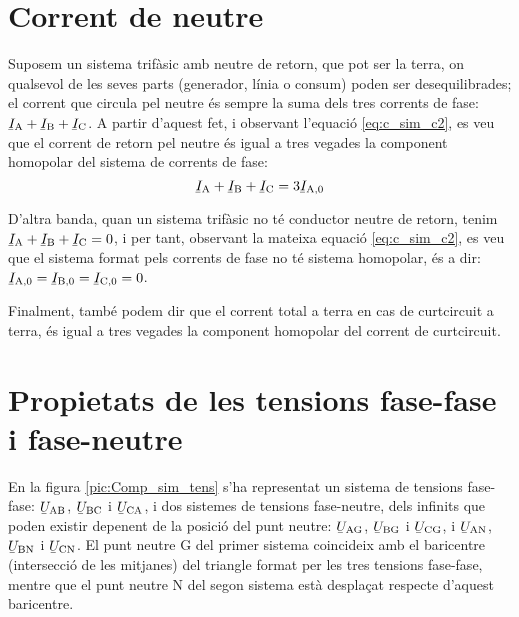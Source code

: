 \section{Corrent de neutre}\label{sec:corrent-neutre}

Suposem un sistema trifàsic amb neutre de retorn, que pot ser la
terra, on qualsevol de les seves parts (generador, línia o consum)
poden ser desequilibrades; el corrent que circula pel neutre és
sempre la suma dels tres corrents de fase: $\cmplx{I}\ped{A}+
\cmplx{I}\ped{B}+\cmplx{I}\ped{C}$. A partir d'aquest fet, i
observant l'equació \eqref{eq:c_sim_c2}, es veu que el corrent de
retorn pel neutre és igual a tres vegades la component homopolar
del sistema de corrents de fase:
\begin{equation}
    \cmplx{I}\ped{A}+\cmplx{I}\ped{B}+\cmplx{I}\ped{C} =3 \cmplx{I}\ped{A,0}
\end{equation}

D'altra banda, quan un sistema trifàsic no té conductor neutre de retorn, tenim
$\cmplx{I}\ped{A}+ \cmplx{I}\ped{B}+\cmplx{I}\ped{C}=0$, i per tant,
observant la mateixa equació \eqref{eq:c_sim_c2}, es veu que el
sistema format pels corrents de fase no té sistema homopolar, és a dir: $\cmplx{I}\ped{A,0}=\cmplx{I}\ped{B,0}=\cmplx{I}\ped{C,0}=0$.

Finalment, també podem dir que el corrent total a terra en cas de
curtcircuit a terra, és igual a tres vegades la component homopolar del
corrent de curtcircuit.

\section{Propietats de les tensions fase-fase i fase-neutre}\label{sec:comp-sim-neutre}
 

En la figura \vref{pic:Comp_sim_tens} s'ha representat un sistema de
tensions fase-fase: $\cmplx{U}\ped{AB}$,
$\cmplx{U}\ped{BC}$ i $\cmplx{U}\ped{CA}$, i dos
sistemes de tensions fase-neutre, dels infinits que poden existir
depenent de la posició del punt neutre: $\cmplx{U}\ped{AG}$,
$\cmplx{U}\ped{BG}$ i $\cmplx{U}\ped{CG}$, i
$\cmplx{U}\ped{AN}$, $\cmplx{U}\ped{BN}$ i
$\cmplx{U}\ped{CN}$. El punt neutre G del primer sistema
coincideix amb el baricentre (intersecció de les mitjanes) del
triangle  format per les tres tensions fase-fase, mentre que el
punt neutre N del segon sistema està desplaçat respecte
d'aquest baricentre.

